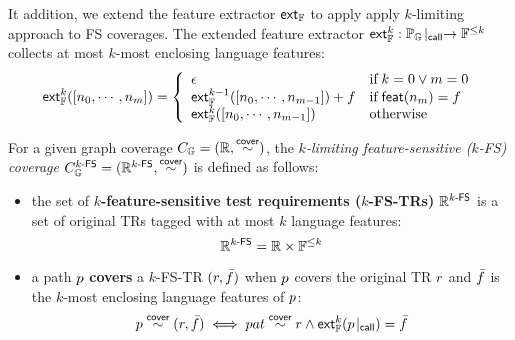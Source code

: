 It addition, we extend the feature extractor $\textsf{ext}_{\mathbb{F}}$ to apply apply
$k$-limiting approach to FS coverages. The extended feature extractor
$\textsf{ext}_{\mathbb{F}}^{k}: {\mathbb{P}_{\mathbb{G}}}\!\mid_{\textsf{call}} \rightarrow \mathbb{F}^{\leq k}$ collects at
most $k$-most enclosing language features:
%
\begin{equation}\label{equ:extfeats}
  \textsf{ext}_{\mathbb{F}}^{k}([n_0, \cdots, n_m]) = \left\{
    \begin{array}{ll}
      \epsilon & \text{if} \; k = 0 \vee m = 0\\

      \textsf{ext}_{\mathbb{F}}^{k-1}([n_0, \cdots, n_{m-1}]) + f & \text{if} \;
      \textsf{feat}(n_m) = f\\
      
      \textsf{ext}_{\mathbb{F}}^{k}([n_0, \cdots, n_{m-1}]) & \text{otherwise}\\
    \end{array}
  \right.
\end{equation}

\begin{definition}\label{def:k-fs-cov}
  For a given graph coverage $C_{\mathbb{G}} = (\mathbb{R}, \overset{\textsf{cover}}{\sim})$, the
  \textit{$k$-limiting feature-sensitive ($k$-FS) coverage} $C_{\mathbb{G}}^{{k}\textsf{-FS}} =
  (\mathbb{R}^{{k}\textsf{-FS}}, \overset{\textsf{cover}}{\sim})$ is defined as follows:
  \begin{itemize}
    \item the set of \textbf{$k$-feature-sensitive test requirements
      ($k$-FS-TRs)} $\mathbb{R}^{{k}\textsf{-FS}}$ is a set of original TRs tagged with
      at most $k$ language features:
      \[
        \mathbb{R}^{{k}\textsf{-FS}} = \mathbb{R} \times \mathbb{F}^{\leq k}
      \]
    \item a path $p$ \textbf{covers} a $k$-FS-TR $(r, \bar{f})$ when $p$
      covers the original TR $r$ and $\bar{f}$ is the $k$-most enclosing
      language features of $p$:
      \[
        p \overset{\textsf{cover}}{\sim} (r, \bar{f}) \iff pat \overset{\textsf{cover}}{\sim} r \wedge
        \textsf{ext}_{\mathbb{F}}^{k}({p}\!\mid_{\textsf{call}}) = \bar{f}
      \]
  \end{itemize}
\end{definition}


